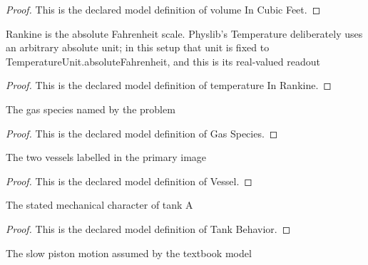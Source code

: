 \begin{proof}
  This is the declared model definition of volume In Cubic Feet.
\end{proof}
\begin{definition}
  \label{def:physics:phyx-mini-0448:phyxminiproblems-problemphyxmini0448-temperatureinrankine}
  Rankine is the absolute Fahrenheit scale. Physlib's Temperature deliberately uses an arbitrary absolute unit; in this setup that unit is fixed to TemperatureUnit.absoluteFahrenheit, and this is its real-valued readout
\end{definition}
\begin{proof}
  This is the declared model definition of temperature In Rankine.
\end{proof}
\begin{definition}
  \label{def:physics:phyx-mini-0448:phyxminiproblems-problemphyxmini0448-gasspecies}
  The gas species named by the problem
\end{definition}
\begin{proof}
  This is the declared model definition of Gas Species.
\end{proof}
\begin{definition}[Vessel]
  \label{def:physics:phyx-mini-0448:phyxminiproblems-problemphyxmini0448-vessel}
  The two vessels labelled in the primary image
\end{definition}
\begin{proof}
  This is the declared model definition of Vessel.
\end{proof}
\begin{definition}
  \label{def:physics:phyx-mini-0448:phyxminiproblems-problemphyxmini0448-tankbehavior}
  The stated mechanical character of tank A
\end{definition}
\begin{proof}
  This is the declared model definition of Tank Behavior.
\end{proof}
\begin{definition}
  \label{def:physics:phyx-mini-0448:phyxminiproblems-problemphyxmini0448-pistonmotionregime}
  The slow piston motion assumed by the textbook model
\end{definition}
